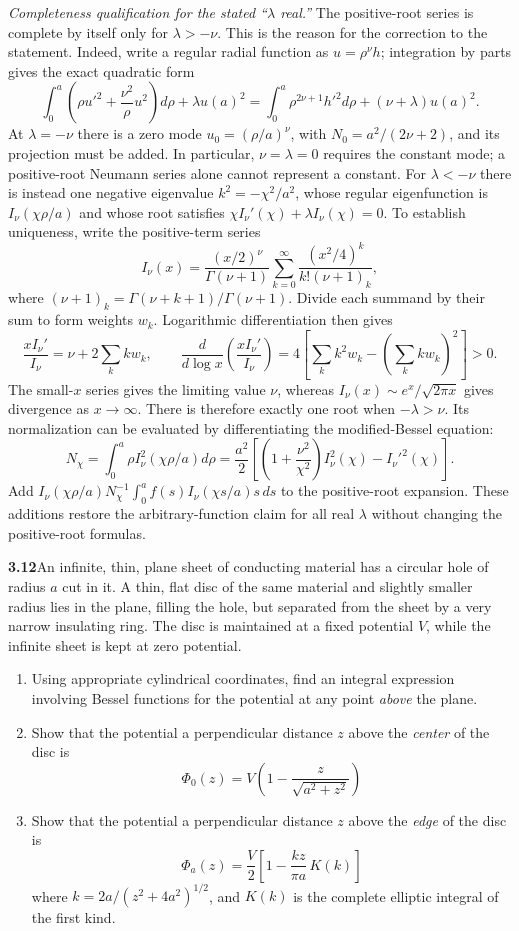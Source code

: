 \emph{Completeness qualification for the stated ``$\lambda$ real.''}
The positive-root series is complete by itself only for
$\lambda> -\nu$.  This is the reason for the correction to the statement.
Indeed, write a regular radial function as $u=\rho^\nu h$; integration
by parts gives the exact quadratic form
\[
\int_0^a\left(\rho u'^2+\frac{\nu^2}{\rho}u^2\right)d\rho
+\lambda u(a)^2
=\int_0^a\rho^{2\nu+1}h'^2d\rho+(\nu+\lambda)u(a)^2.
\]
At $\lambda=-\nu$ there is a zero mode $u_0=(\rho/a)^\nu$,
with $N_0=a^2/(2\nu+2)$, and its projection must be added.
In particular, $\nu=\lambda=0$ requires the constant mode; a
positive-root Neumann series alone cannot represent a constant.
For $\lambda<-\nu$ there is instead one negative eigenvalue
$k^2=-\chi^2/a^2$, whose regular eigenfunction is
$I_\nu(\chi\rho/a)$ and whose root satisfies
$\chi I_\nu'(\chi)+\lambda I_\nu(\chi)=0$.
To establish uniqueness, write the positive-term series
\[
I_\nu(x)=\frac{(x/2)^\nu}{\Gamma(\nu+1)}
\sum_{k=0}^\infty\frac{(x^2/4)^k}{k!(\nu+1)_k},
\]
where $(\nu+1)_k=\Gamma(\nu+k+1)/\Gamma(\nu+1)$.  Divide each
summand by their sum to form weights $w_k$.  Logarithmic
differentiation then gives
\[
\frac{xI_\nu'}{I_\nu}=\nu+2\sum_k k w_k,\qquad
\frac{d}{d\log x}\left(\frac{xI_\nu'}{I_\nu}\right)
=4\left[\sum_k k^2w_k-\left(\sum_k kw_k\right)^2\right]>0.
\]
The small-$x$ series gives the limiting value $\nu$, whereas
$I_\nu(x)\sim e^x/\sqrt{2\pi x}$ gives divergence as $x\to\infty$.
There is therefore exactly one root when $-\lambda>\nu$.
Its normalization can be evaluated by differentiating the
modified-Bessel equation:
\[
N_\chi=\int_0^a\rho I_\nu^2(\chi\rho/a)d\rho
=\frac{a^2}{2}\left[
\left(1+\frac{\nu^2}{\chi^2}\right)I_\nu^2(\chi)
-I_\nu'^2(\chi)\right].
\]
Add $I_\nu(\chi\rho/a)N_\chi^{-1}
\int_0^a f(s)I_\nu(\chi s/a)s\,ds$ to the positive-root expansion.
These additions restore the arbitrary-function claim for all real
$\lambda$ without changing the positive-root formulas.

\par\bigskip
\noindent\textbf{3.12}\quad An infinite, thin, plane sheet of conducting material has a circular hole of radius $a$ cut in it. A thin, flat disc of the same material and slightly smaller radius lies in the plane, filling the hole, but separated from the sheet by a very narrow insulating ring. The disc is maintained at a fixed potential $V$, while the infinite sheet is kept at zero potential.
\begin{enumerate}
\item[(a)] Using appropriate cylindrical coordinates, find an integral expression involving Bessel functions for the potential at any point \emph{above} the plane.
\item[(b)] Show that the potential a perpendicular distance $z$ above the \emph{center} of the disc is
\[
\Phi_{0}(z)=V\!\left(1-\frac{z}{\sqrt{a^{2}+z^{2}}}\right)
\]
\item[(c)] Show that the potential a perpendicular distance $z$ above the \emph{edge} of the disc is
\[
\Phi_{a}(z)=\frac{V}{2}\left[1-\frac{kz}{\pi a}\,K(k)\right]
\]
where $k=2a/(z^{2}+4a^{2})^{1/2}$, and $K(k)$ is the complete elliptic integral of the first kind.
\end{enumerate}
\solution

